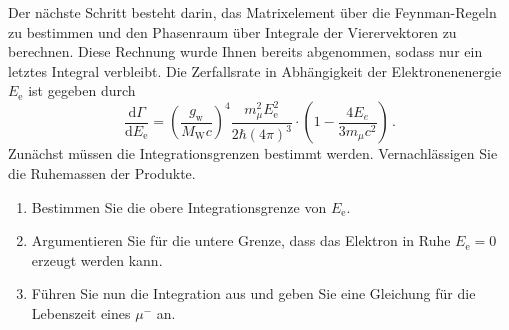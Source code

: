 \documentclass{exercise}
\begin{document}
    Der nächste Schritt besteht darin, das Matrixelement über die Feynman-Regeln zu bestimmen und den Phasenraum über Integrale der Vierervektoren zu berechnen.
    Diese Rechnung wurde Ihnen bereits abgenommen, sodass nur ein letztes Integral verbleibt. 
    Die Zerfallsrate in Abhängigkeit der Elektronenenergie $E_\text{e}$ ist gegeben durch 
    \begin{equation}
        \dfrac{\mathrm{d} \Gamma}{\mathrm{d} E_\text{e}} = \left(\dfrac{g_\text{w}}{M_\text{W}c}\right)^4 \dfrac{m_\mu^2 E^2_\text{e}}{2\hbar \left( 4 \pi\right)^3} \cdot \left(1 - \dfrac{4 E_e}{3 m_\mu c^2}\right) \,.
    \end{equation}
    Zunächst müssen die Integrationsgrenzen bestimmt werden. Vernachlässigen Sie die Ruhemassen der Produkte.
    \begin{enumerate}[resume] 
        \item Bestimmen Sie die obere Integrationsgrenze von $E_\text{e}$. 
        \item Argumentieren Sie für die untere Grenze, dass das Elektron in Ruhe $E_\text{e} = 0$ erzeugt werden kann.  
    
        \item Führen Sie nun die Integration aus und geben Sie eine Gleichung für die Lebenszeit eines $\mu^-$ an.
    

\end{enumerate}
\end{document}
